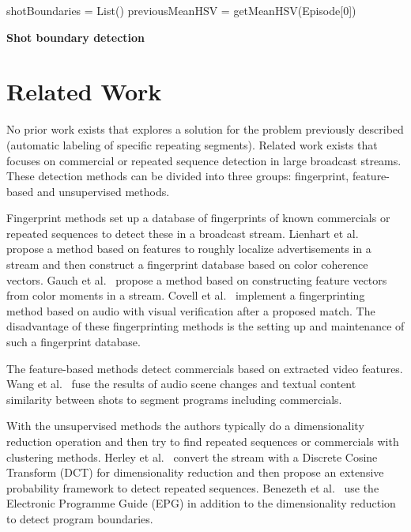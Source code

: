 \documentclass{article}
\begin{document}
\begin{algorithm}[h] 
	\SetAlgoLined
	shotBoundaries = List()\;
	previousMeanHSV = getMeanHSV(Episode[0])\;
	\caption{\textbf{Shot boundary detection}}
	\label{algorithm:shotboundary}
\end{algorithm}

\section{Related Work} \label{relatedwork}

No prior work exists that explores a solution for the problem previously described (automatic labeling of specific repeating segments). Related work exists that focuses on commercial or repeated sequence detection in large broadcast streams. These detection methods can be divided into three groups: fingerprint, feature-based and unsupervised methods. 

Fingerprint methods set up a database of fingerprints of known commercials or repeated sequences to detect these in a broadcast stream. Lienhart et al.\ \cite{lienhart1997detection} propose a method based on features to roughly localize advertisements in a stream and then construct a fingerprint database based on color coherence vectors. Gauch et al.\ \cite{gauch2006finding} propose a method based on constructing feature vectors from color moments in a stream. Covell et al.\ \cite{covell2006advertisement} implement a fingerprinting method based on audio with visual verification after a proposed match. The disadvantage of these fingerprinting methods is the setting up and maintenance of such a fingerprint database.


The feature-based methods detect commercials based on extracted video features. Wang et al.\ \cite{wang2008multimodal} fuse the results of audio scene changes and textual content similarity between shots to segment programs including commercials.

With the unsupervised methods the authors typically do a dimensionality reduction operation and then try to find repeated sequences or commercials with clustering methods. Herley et al.\ \cite{herley2006argos} convert the stream with a Discrete Cosine Transform (DCT) for dimensionality reduction and then propose an extensive probability framework to detect repeated sequences. Benezeth et al.\ \cite{benezeth2010unsupervised} use the Electronic Programme Guide (EPG) in addition to the dimensionality reduction to detect program boundaries.
\end{document}
